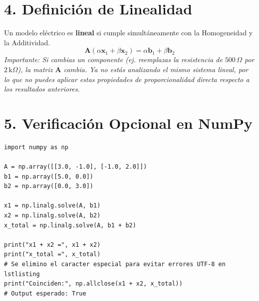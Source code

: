 \documentclass[11pt, a4paper]{article}
\begin{document}
\section*{4. Definición de Linealidad}
Un modelo eléctrico es \textbf{lineal} si cumple simultáneamente con la Homogeneidad y la Additividad.
\begin{equation*}
    \bm{A} (\alpha\bm{x}_1 + \beta\bm{x}_2) = \alpha\bm{b}_1 + \beta\bm{b}_2
\end{equation*}
\textit{Importante: Si cambias un componente (ej. reemplazas la resistencia de $500\,\Omega$ por $2\,\text{k}\Omega$), la matriz $\bm{A}$ cambia. Ya no estás analizando el mismo sistema lineal, por lo que no puedes aplicar estas propiedades de proporcionalidad directa respecto a los resultados anteriores.}

\section*{5. Verificación Opcional en NumPy}
\begin{lstlisting}
import numpy as np

A = np.array([[3.0, -1.0], [-1.0, 2.0]])
b1 = np.array([5.0, 0.0])
b2 = np.array([0.0, 3.0])

x1 = np.linalg.solve(A, b1)
x2 = np.linalg.solve(A, b2)
x_total = np.linalg.solve(A, b1 + b2)

print("x1 + x2 =", x1 + x2)
print("x_total =", x_total)
# Se elimino el caracter especial para evitar errores UTF-8 en lstlisting
print("Coinciden:", np.allclose(x1 + x2, x_total))
# Output esperado: True
\end{lstlisting}
\end{document}
